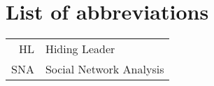 \documentclass[english,bachelor,unicode]{ctufit-thesis}
\theoremstyle{plain}
\theoremstyle{definition}
\theoremstyle{remark}
\numberwithin{theorem}{chapter}
\begin{document}
\printabstractpage %


\chapter{List of abbreviations}

\begin{tabular}{rl}
HL & Hiding Leader\\
SNA & Social Network Analysis
\end{tabular}


\mainmatter\mainmatterinit %


%



%
% 

\appendix\appendixinit %


\backmatter %

\printbibliography %

\end{document}
